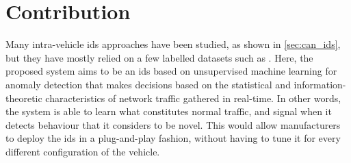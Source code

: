 \chapter{Contribution}
\label{c:contribution}

Many intra-vehicle \gls{ids} approaches have been studied, as shown in \ref{sec:can_ids}, but they have mostly relied on a few labelled datasets such as \cite{CANDataset_Car-Hacking}. Here, the proposed system aims to be an \gls{ids} based on unsupervised machine learning for anomaly detection that makes decisions based on the statistical and information-theoretic characteristics of network traffic gathered in real-time. In other words, the system is able to learn what constitutes normal traffic, and signal when it detects behaviour that it considers to be novel. This would allow manufacturers to deploy the \gls{ids} in a plug-and-play fashion, without having to tune it for every different configuration of the vehicle.